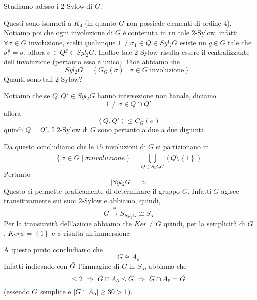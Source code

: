 Studiamo adesso i $2$-Sylow di $G$.

Questi sono isomorfi a $K_4$ (in quanto $G$ non possiede elementi di ordine $4$). Notiamo poi che ogni involuzione di $G$ \`e contenuta
in un tale $2$-Sylow, infatti $\forall\sigma\in G$ involuzione, scelti qualunque $1\neq\sigma_1\in Q\in Syl_2G$ esiste un $g\in G$
tale che $\sigma_1^g=\sigma$, allora $\sigma\in Q^g\in Syl_2G$.
Inoltre tale $2$-Sylow risulta essere il centralizzante dell'involuzione (pertanto esso \`e unico). Cio\`e abbiamo che
\begin{equation*}
Syl_2G = \left\{G_G(\sigma)\mid\sigma\in G\text{ involuzione}\right\}.
\end{equation*}
Quanti sono tali $2$-Sylow?

Notiamo che se $Q,Q'\in Syl_2G$ hanno intersezione non banale, diciamo
\begin{equation*}
1\neq\sigma\in Q\cap Q'
\end{equation*}
allora
\begin{equation*}
\left<Q,Q'\right>\leq C_G(\sigma)
\end{equation*}
quindi $Q=Q'$. I $2$-Sylow di $G$ sono pertanto a due a due digiunti.

Da questo concludiamo che le $15$ involuzioni di $G$ si partizionano in
\begin{equation*}
\left\{\sigma\in G\mid\sigma involuzione\right\}=\underset{Q\in Syl_2G}{\overset{\cdot}\bigcup}(Q\setminus\left\{1\right\})
\end{equation*}
Pertanto 
\begin{equation*}
\left|Syl_2G\right|=5.
\end{equation*}
Questo ci permette praticamente di determinare il gruppo $G$. Infatti $G$ agisce transitivamente sui suoi $2$-Sylow e abbiamo, quindi,
\begin{equation*}
G\overset\phi\longrightarrow S_{Syl_2G}\cong S_5
\end{equation*}
Per la transitivit\`a dell'azione abbiamo che $Ker\neq G$ quindi, per la semplicit\`a di $G$, $Ker\phi=\left\{1\right\}$ e $\phi$ risulta
un'immersione.

A questo punto concludiamo che
\begin{equation*}
G\cong A_5
\end{equation*}
Infatti indicando con $\Tilde{G}$ l'immagine di $G$ in $S_5$, abbiamo che
\begin{equation*}
[\Tilde{G}:\Tilde{G}\cap A_5]\leq 2\ \Rightarrow\ \Tilde{G}\cap A_5\trianglelefteq\Tilde{G}\ \Rightarrow\ \Tilde{G}\cap A_5=\Tilde{G}
\end{equation*}
(essendo $\Tilde{G}$ semplice e $|\Tilde{G}\cap A_5|\geq 30>1$).


